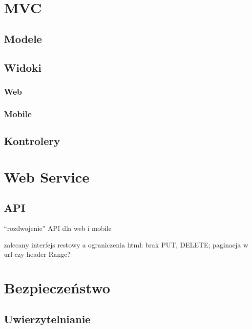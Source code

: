 \documentclass[11pt]{aghdpl}
\begin{document}
\section{MVC}

\subsection{Modele}

\subsection{Widoki}


\subsubsection{Web}

\subsubsection{Mobile}

\subsection{Kontrolery}


\section{Web Service}

\subsection{API}

``rozdwojenie'' API dla web i mobile

zalecany interfejs restowy a ograniczenia html: brak PUT, DELETE; paginacja w url czy header Range?

\section{Bezpieczeństwo}

\subsection{Uwierzytelnianie}

\end{document}
